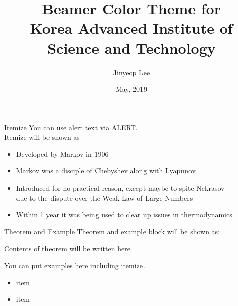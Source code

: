 \documentclass[english]{beamer} %
\begin{document}
\title[Beamer Color Theme for KAIST]{Beamer Color Theme for \\Korea Advanced Institute of Science and Technology}

\author{Jinyeop Lee}
\date{May, 2019}


\begin{frame}
  \titlepage
\end{frame}


\newcommand{\Gaussian}{\rput(0,-0.35){\psset{yunit=0.8cm,xunit=0.3}
     \psGauss[linecolor=red, linewidth=0.8pt, sigma=0.5]{-1.5}{1.5}}}
\def\dedge{\ncline[linestyle=dashed]}
\def\omitnode{\Tr*[edge=\dedge]{}}

\begin{frame}{Itemize}
You can use alert text via \alert{ALERT}.\\
Itemize will be shown as
\begin{itemize}[<+->]
\item Developed by Markov in 1906
\item Markov was a disciple of Chebyshev  along with Lyapunov
\item Introduced for no practical reason, except maybe to spite Nekrasov\\
due to the dispute over the Weak Law of Large Numbers
\item Within 1 year it was being used to clear up issues in thermodynamics
\end{itemize}
\end{frame}

\begin{frame}{Theorem and Example}
Theorem and example block will be shown as:
\begin{theorem}
	Contents of theorem will be written here.
\end{theorem}

\begin{example}
	You can put examples here including itemize.
	\begin{itemize}
		\item item
		\item item
	\end{itemize}
\end{example}
\end{frame}
\end{document}

